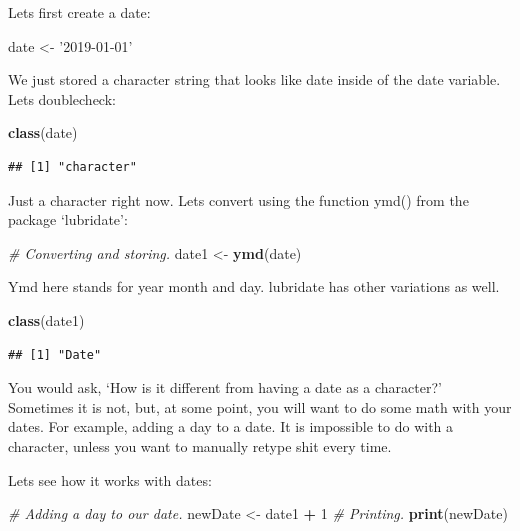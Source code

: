 \documentclass[]{book}
\newenvironment{Shaded}{\begin{snugshade}}{\end{snugshade}}
\newcommand{\CommentTok}[1]{\textcolor[rgb]{0.56,0.35,0.01}{\textit{#1}}}
\newcommand{\DecValTok}[1]{\textcolor[rgb]{0.00,0.00,0.81}{#1}}
\newcommand{\KeywordTok}[1]{\textcolor[rgb]{0.13,0.29,0.53}{\textbf{#1}}}
\newcommand{\NormalTok}[1]{#1}
\newcommand{\OperatorTok}[1]{\textcolor[rgb]{0.81,0.36,0.00}{\textbf{#1}}}
\newcommand{\StringTok}[1]{\textcolor[rgb]{0.31,0.60,0.02}{#1}}
\begin{document}
Lets first create a date:

\begin{Shaded}
\begin{Highlighting}[]
\NormalTok{date <-}\StringTok{ '2019-01-01'}
\end{Highlighting}
\end{Shaded}

We just stored a character string that looks like date inside of the date variable. Lets doublecheck:

\begin{Shaded}
\begin{Highlighting}[]
\KeywordTok{class}\NormalTok{(date)}
\end{Highlighting}
\end{Shaded}

\begin{verbatim}
## [1] "character"
\end{verbatim}

Just a character right now. Lets convert using the function ymd() from the package `lubridate':

\begin{Shaded}
\begin{Highlighting}[]
\CommentTok{# Converting and storing.}
\NormalTok{date1 <-}\StringTok{ }\KeywordTok{ymd}\NormalTok{(date) }
\end{Highlighting}
\end{Shaded}

Ymd here stands for year month and day. lubridate has other variations as well.

\begin{Shaded}
\begin{Highlighting}[]
\KeywordTok{class}\NormalTok{(date1)}
\end{Highlighting}
\end{Shaded}

\begin{verbatim}
## [1] "Date"
\end{verbatim}

You would ask, `How is it different from having a date as a character?' Sometimes it is not, but, at some point, you will want to do some math with your dates. For example, adding a day to a date. It is impossible to do with a character, unless you want to manually retype shit every time.

Lets see how it works with dates:

\begin{Shaded}
\begin{Highlighting}[]
\CommentTok{# Adding a day to our date.}
\NormalTok{newDate <-}\StringTok{ }\NormalTok{date1 }\OperatorTok{+}\StringTok{ }\DecValTok{1}
\CommentTok{# Printing.}
\KeywordTok{print}\NormalTok{(newDate)}
\end{Highlighting}
\end{Shaded}
\end{document}
